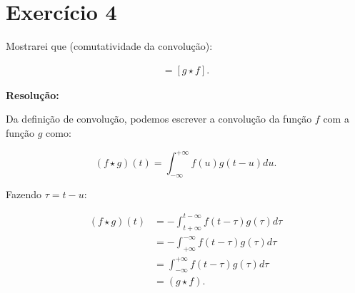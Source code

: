 
\section*{\large Exercício 4}
%

Mostrarei que (comutatividade da convolução):

\begin{align*}
[f \star g] = [g \star f].
\end{align*}

\textbf{Resolução:}

Da definição de convolução, podemos escrever a convolução da função $f$ com a função $g$ como:

\begin{equation*}
(f \star g)(t) = \int_{-\infty}^{+\infty}f(u)g(t-u)d u.
\end{equation*}

Fazendo $\tau = t-u$:

\begin{align*}
(f \star g)(t) &= -\int_{t+\infty}^{t-\infty}f(t - \tau)g(\tau)d \tau \\[10pt]
 &= -\int_{+\infty}^{-\infty}f(t - \tau)g(\tau) d \tau \\[10pt]
 &= \int_{-\infty}^{+\infty}f(t-\tau)g(\tau)d\tau \\[10pt]
 &= (g \star f). \tag*{(Q.E.D.)}
\end{align*}

